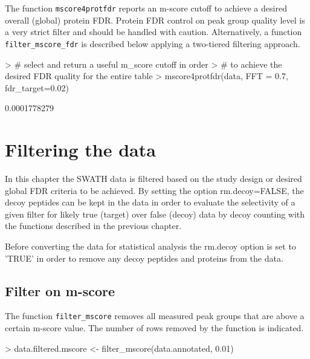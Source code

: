 \documentclass[a4paper]{article}
\begin{document}
The function \texttt{mscore4protfdr} reports an m-score cutoff to achieve a desired overall (global) protein FDR. Protein FDR control on peak group quality level is a very strict filter and should be handled with caution.
Alternatively, a function \texttt{filter\_mscore\_fdr} is described below applying a two-tiered filtering approach.
\\

\begin{Schunk}
\begin{Sinput}
> # select and return a useful m_score cutoff in order
> # to achieve the desired FDR quality for the entire table
> mscore4protfdr(data, FFT = 0.7, fdr_target=0.02)
\end{Sinput}
\begin{Soutput}
[1] 0.0001778279
\end{Soutput}
\end{Schunk}

\section{Filtering the data}
In this chapter the SWATH data is filtered based on the study design or desired global FDR criteria to be achieved.
By setting the option rm.decoy=FALSE, the decoy peptides can be kept in the data in order to evaluate the selectivity of a given filter for likely true (target) over false (decoy) data by decoy counting with the functions described in the previous chapter.

Before converting the data for statistical analysis the rm.decoy option is set to 'TRUE' in order to remove any decoy peptides and proteins from the data.\\

\subsection{Filter on m-score}
The function \texttt{filter\_mscore} removes all measured peak groups that are above a certain m-score value. The number of rows removed by the function is indicated.

\begin{Schunk}
\begin{Sinput}
> data.filtered.mscore <- filter_mscore(data.annotated, 0.01)
\end{Sinput}
\end{Schunk}
\end{document}
